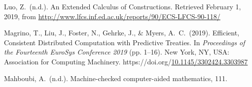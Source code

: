 \documentclass[12pt,twoside]{article}
\begin{document}
{\begin{thebibliography}{1079}
\mdbibitemlabel{}Luo, Z.~(n.d.). An Extended Calculus of Constructions. Retrieved February 1, 2019, from \href{http://www.lfcs.inf.ed.ac.uk/reports/90/ECS-LFCS-90-118/}{{\ttfamily http://\hspace{0pt}www.\hspace{0pt}lfcs.\hspace{0pt}inf.\hspace{0pt}ed.\hspace{0pt}ac.\hspace{0pt}uk/\hspace{0pt}reports/\hspace{0pt}90/\hspace{0pt}ECS-\hspace{0pt}LFCS-\hspace{0pt}90-\hspace{0pt}118/\hspace{0pt}}}%

\mdbibitemlabel{}Magrino, T., Liu, J., Foster, N., Gehrke, J., \& Myers, A.~C.~(2019). Efficient, Consistent Distributed Computation with Predictive Treaties. In \emph{Proceedings of the Fourteenth EuroSys Conference 2019} (pp. 1–16). New York, NY, USA: Association for Computing Machinery. https://doi.org/\href{https://dx.doi.org/10.1145/3302424.3303987}{10.1145/3302424.3303987}%

\mdbibitemlabel{}Mahboubi, A.~(n.d.). Machine-checked computer-aided mathematics, 111.%


\end{thebibliography}}
\end{document}
